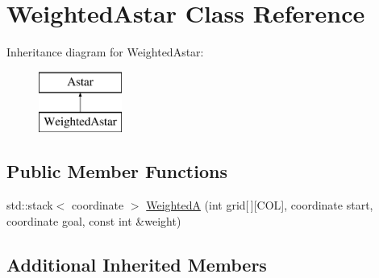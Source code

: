 \hypertarget{classWeightedAstar}{\section{Weighted\-Astar Class Reference}
\label{classWeightedAstar}
}
Inheritance diagram for Weighted\-Astar\-:\begin{figure}[H]
\begin{center}
\leavevmode
\includegraphics[height=2.000000cm]{classWeightedAstar}
\end{center}
\end{figure}
\subsection*{Public Member Functions}
\begin{DoxyCompactItemize}
\item 
std\-::stack$<$ coordinate $>$ \hyperlink{classWeightedAstar_a1794edfb3807236774434e7bc152bce2}{Weighted\-A} (int grid\mbox{[}$\,$\mbox{]}\mbox{[}C\-O\-L\mbox{]}, coordinate start, coordinate goal, const int \&weight)
\end{DoxyCompactItemize}
\subsection*{Additional Inherited Members}


